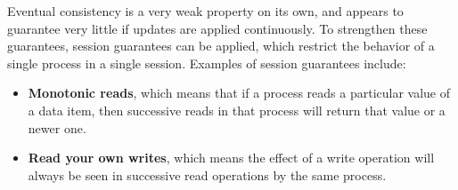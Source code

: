 \documentclass[12pt,titlepage]{article}
\begin{document}
        Eventual consistency is a very weak property on its own, and appears to guarantee very little if updates are applied continuously. To strengthen
        these guarantees, session guarantees can be applied, which restrict the behavior of a single process in a single session. Examples of session
        guarantees include:
        \begin{itemize}
          \item \textbf{Monotonic reads}, which means that if a process reads a particular value of a data item, then successive reads in that process will
            return that value or a newer one.
          \item \textbf{Read your own writes}, which means the effect of a write operation will always be seen in successive read operations by the same process.
        \end{itemize}
\end{document}
